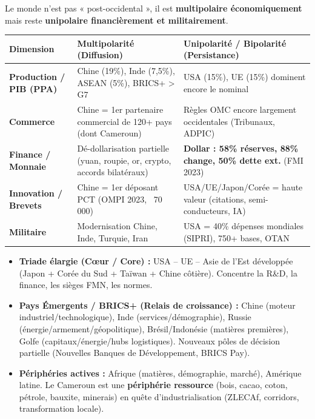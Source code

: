 \documentclass[11pt]{article}
\begin{document}
Le monde n'est pas « post-occidental », il est \textbf{multipolaire économiquement} mais reste \textbf{unipolaire financièrement et militairement}.

\begin{center}
\begin{tabularx}{\linewidth}{|l|X|X|}
\hline
\rowcolor{popblueL} \textbf{Dimension} & \textbf{Multipolarité (Diffusion)} & \textbf{Unipolarité / Bipolarité (Persistance)} \\ \hline
\textbf{Production / PIB (PPA)} & Chine (19\%), Inde (7,5\%), ASEAN (5\%), BRICS+ > G7 & USA (15\%), UE (15\%) dominent encore le nominal \\ \hline
\textbf{Commerce} & Chine = 1er partenaire commercial de 120+ pays (dont Cameroun) & Règles OMC encore largement occidentales (Tribunaux, ADPIC) \\ \hline
\textbf{Finance / Monnaie} & Dé-dollarisation partielle (yuan, roupie, or, crypto, accords bilatéraux) & \textbf{Dollar : 58\% réserves, 88\% change, 50\% dette ext.} (FMI 2023) \\ \hline
\textbf{Innovation / Brevets} & Chine = 1er déposant PCT (OMPI 2023, ~70 000) & USA/UE/Japon/Corée = haute valeur (citations, semi-conducteurs, IA) \\ \hline
\textbf{Militaire} & Modernisation Chine, Inde, Turquie, Iran & USA = 40\% dépenses mondiales (SIPRI), 750+ bases, OTAN \\ \hline
\end{tabularx}
\end{center}

\begin{aretenir}
\begin{itemize}
    \item \textbf{Triade élargie (Cœur / Core) :} USA -- UE -- Asie de l'Est développée (Japon + Corée du Sud + Taïwan + Chine côtière). Concentre la R\&D, la finance, les sièges FMN, les normes.
    \item \textbf{Pays Émergents / BRICS+ (Relais de croissance) :} Chine (moteur industriel/technologique), Inde (services/démographie), Russie (énergie/armement/géopolitique), Brésil/Indonésie (matières premières), Golfe (capitaux/énergie/hubs logistiques). Nouveaux pôles de décision partielle (Nouvelles Banques de Développement, BRICS Pay).
    \item \textbf{Périphéries actives :} Afrique (matières, démographie, marché), Amérique latine. Le Cameroun est une \textbf{périphérie ressource} (bois, cacao, coton, pétrole, bauxite, minerais) en quête d'industrialisation (ZLECAf, corridors, transformation locale).
\end{itemize}
\end{aretenir}
\end{document}

